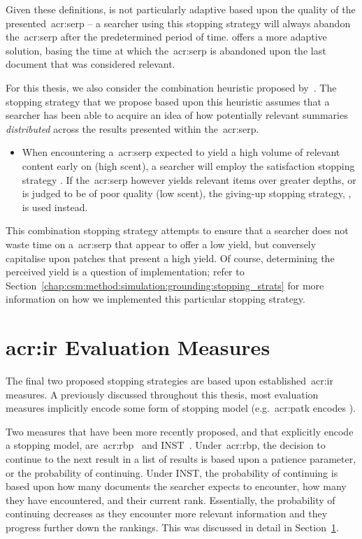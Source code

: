 Given these definitions,  is not particularly adaptive based upon the quality of the presented~\gls{acr:serp} -- a searcher using this stopping strategy will always abandon the~\gls{acr:serp} after the predetermined period of time.  offers a more adaptive solution, basing the time at which the~\gls{acr:serp} is abandoned upon the last document that was considered relevant.

For this thesis, we also consider the combination heuristic proposed by~\cite{mcnair1982gut_mvt}. The stopping strategy that we propose based upon this heuristic assumes that a searcher has been able to acquire an idea of how potentially relevant summaries \emph{distributed} across the results presented within the~\gls{acr:serp}.

\begin{itemize}
    \item{ When encountering a~\gls{acr:serp} expected to yield a high volume of relevant content early on (high scent), a searcher will employ the satisfaction stopping strategy . If the~\gls{acr:serp} however yields relevant items over greater depths, or is judged to be of poor quality (low scent), the giving-up stopping strategy, , is used instead.}
\end{itemize}

This combination stopping strategy attempts to ensure that a searcher does not waste time on a~\gls{acr:serp} that appear to offer a low yield, but conversely capitalise upon patches that present a high yield. Of course, determining the perceived yield is a question of implementation; refer to Section~\ref{chap:csm:method:simulation:grounding:stopping_strats} for more information on how we implemented this particular stopping strategy.

\section{\gls{acr:ir} Evaluation Measures}
The final two proposed stopping strategies are based upon established~\gls{acr:ir} measures. A previously discussed throughout this thesis, most evaluation measures implicitly encode some form of stopping model (e.g.~\gls{acr:patk} encodes ).

Two measures that have been more recently proposed, and that explicitly encode a stopping model, are~\gls{acr:rbp}~\citep{moffat2008rbp} and INST~\citep{bailey2015inst, moffat2015inst}. Under~\gls{acr:rbp}, the decision to continue to the next result in a list of results is based upon a patience parameter, or the probability of continuing. Under INST, the probability of continuing is based upon how many documents the searcher expects to encounter, how many they have encountered, and their current rank. Essentially, the probability of continuing decreases as they encounter more relevant information and they progress further down the rankings. This was discussed in detail in Section~\ref{}.

